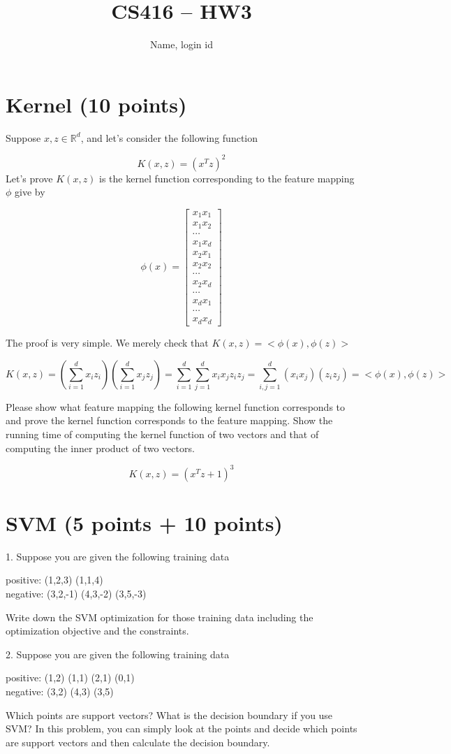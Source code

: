 \documentclass{article}
\title{CS416 -- HW3}
\author{Name, login id}
\date{}
\begin{document}
\maketitle

\section{Kernel (10 points)}
Suppose $x,z\in \mathbb{R}^d$, and let's consider the following function

$$K(x,z)=(x^T z)^2
$$
Let's prove $K(x,z)$ is the kernel function corresponding to the feature mapping $\phi$ give by 

$$
\phi(x)=
\begin{bmatrix}
x_1x_1\\
x_1x_2\\
\cdots\\
x_1x_d\\
x_2x_1\\
x_2x_2\\
\cdots\\
x_2x_d\\
\cdots\\
x_dx_1\\
\cdots\\
x_dx_d
\end{bmatrix}
$$

The proof is very simple. We merely check that $K(x,z)=<\phi(x), \phi(z)>$

$$
K(x,z) = (\sum^d_{i=1}x_i z_i) (\sum^d_{i=1}x_j z_j)
=\sum^d_{i=1}\sum^d_{j=1}x_ix_jz_iz_j=\sum^d_{i,j=1} (x_ix_j)(z_iz_j)=<\phi(x), \phi(z)>
$$

Please show what feature mapping the  following kernel function corresponds to and prove the kernel function corresponds to the feature mapping. Show the running time of computing the kernel function of two vectors and that of computing the inner product of two vectors.  

$$
K(x,z)=(x^T z+1)^3
$$


\section{SVM (5 points + 10 points)}

1. Suppose you are given the following training data 

positive: (1,2,3) (1,1,4) \\
negative: (3,2,-1) (4,3,-2) (3,5,-3)

Write down the SVM optimization for those training data including the optimization objective and the constraints. 

2. Suppose you are given the following training data 

positive: (1,2) (1,1) (2,1) (0,1)\\
negative: (3,2) (4,3) (3,5)

Which points are support vectors? What is the decision boundary if you use SVM? In this problem, you can simply look at the points and decide which points are support vectors and then calculate the decision boundary. 
\end{document}
